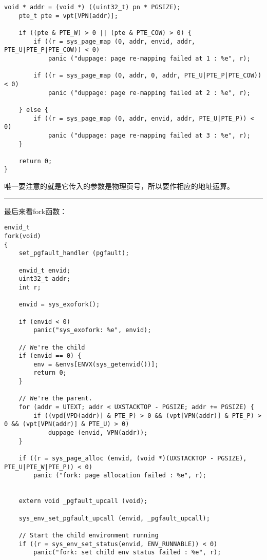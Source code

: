 \documentclass{article}
\begin{document}
\begin{CJK*}{UTF8}{gkai}
\begin{lstlisting}[style=ccode, title={\scriptsize \ttfamily \bfseries lib/fork.c: duppage()}]
    void * addr = (void *) ((uint32_t) pn * PGSIZE);
    pte_t pte = vpt[VPN(addr)];

    if ((pte & PTE_W) > 0 || (pte & PTE_COW) > 0) {
        if ((r = sys_page_map (0, addr, envid, addr, PTE_U|PTE_P|PTE_COW)) < 0)
            panic ("duppage: page re-mapping failed at 1 : %e", r);

        if ((r = sys_page_map (0, addr, 0, addr, PTE_U|PTE_P|PTE_COW)) < 0)
            panic ("duppage: page re-mapping failed at 2 : %e", r);

    } else {
        if ((r = sys_page_map (0, addr, envid, addr, PTE_U|PTE_P)) < 0)
            panic ("duppage: page re-mapping failed at 3 : %e", r);
    }
     
    return 0;
}
\end{lstlisting}

唯一要注意的就是它传入的参数是物理页号，所以要作相应的地址运算。

\vspace{2em}
\hrule
\vspace{2em}

最后来看fork函数：


\begin{lstlisting}[style=ccode, title={\scriptsize \ttfamily \bfseries lib/fork.c: fork()}]
envid_t
fork(void)
{
    set_pgfault_handler (pgfault);

    envid_t envid;
    uint32_t addr;
    int r;

    envid = sys_exofork();
	
    if (envid < 0)
        panic("sys_exofork: %e", envid);

    // We're the child
    if (envid == 0) {
        env = &envs[ENVX(sys_getenvid())];
        return 0;
    }

	// We're the parent.
    for (addr = UTEXT; addr < UXSTACKTOP - PGSIZE; addr += PGSIZE) {
        if ((vpd[VPD(addr)] & PTE_P) > 0 && (vpt[VPN(addr)] & PTE_P) > 0 && (vpt[VPN(addr)] & PTE_U) > 0)
            duppage (envid, VPN(addr));
    }

    if ((r = sys_page_alloc (envid, (void *)(UXSTACKTOP - PGSIZE), PTE_U|PTE_W|PTE_P)) < 0)
        panic ("fork: page allocation failed : %e", r);

    
    extern void _pgfault_upcall (void);

    sys_env_set_pgfault_upcall (envid, _pgfault_upcall);

    // Start the child environment running
    if ((r = sys_env_set_status(envid, ENV_RUNNABLE)) < 0)
        panic("fork: set child env status failed : %e", r);


\end{lstlisting}
\end{CJK*}
\end{document}
